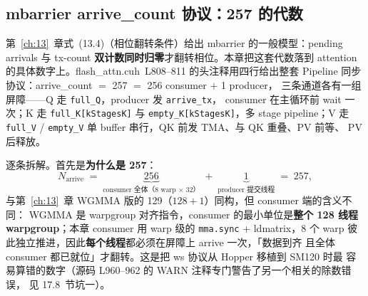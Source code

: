 \subsection{mbarrier arrive\_count 协议：257 的代数}

第~\ref{ch:13}~章式~(13.4)（相位翻转条件）给出 mbarrier 的一般模型：pending
arrivals 与 tx-count \textbf{双计数同时归零}才翻转相位。本章把这套代数落到
attention 的具体数字上。flash\_attn.cuh~L808--811 的头注释用四行给出整套
Pipeline 同步协议：arrive\_count $=$ 257 $=$ 256 consumer $+$ 1 producer，
三条通道各有一组屏障——Q 走 \texttt{full\_Q}，producer 发 \texttt{arrive\_tx}，
consumer 在主循环前 wait 一次；K 走 \texttt{full\_K[kStagesK]} 与
\texttt{empty\_K[kStagesK]}，多 stage pipeline；V 走 \texttt{full\_V} /
\texttt{empty\_V} 单 buffer 串行，QK 前发 TMA、与 QK 重叠、PV 前等、
PV 后释放。

逐条拆解。首先是\textbf{为什么是 257}：
\begin{equation}
  N_{\text{arrive}} \;=\;
  \underbrace{256}_{\text{consumer 全体（8 warp $\times$ 32）}}
  \;+\; \underbrace{1}_{\text{producer 提交线程}} \;=\; 257 ,
  \label{eq:17-257}
\end{equation}
与第~\ref{ch:13}~章 WGMMA 版的 129（$128 + 1$）同构，但 consumer 端的含义不同：
WGMMA 是 warpgroup 对齐指令，consumer 的最小单位是\textbf{整个 128 线程
warpgroup}；本章 consumer 用 warp 级的 \texttt{mma.sync} + ldmatrix，8 个 warp
彼此独立推进，因此\textbf{每个线程}都必须在屏障上 arrive 一次，「数据到齐
且全体 consumer 都已就位」才翻转。这是把 ws 协议从 Hopper 移植到 SM120 时最
容易算错的数字（源码 L960--962 的 WARN 注释专门警告了另一个相关的除数错误，
见 17.8~节坑一）。


